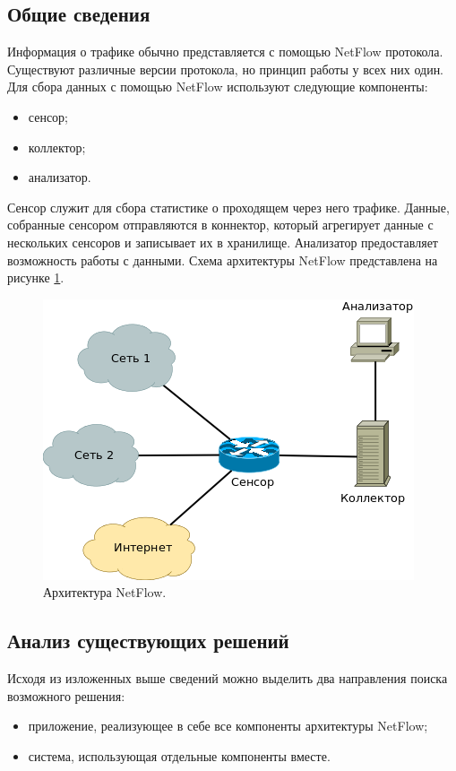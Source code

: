 \subsection{ Общие сведения }
Информация о трафике обычно представляется с помощью NetFlow протокола\cite{netflow}. Существуют различные версии протокола, но принцип работы у всех них один. Для сбора данных с помощью NetFlow используют следующие компоненты:
\begin{itemize}
	\item сенсор;
	\item коллектор;
	\item анализатор.
\end{itemize}
Сенсор служит для сбора статистике о проходящем через него трафике. Данные, собранные сенсором отправляются в коннектор, который агрегирует данные с нескольких сенсоров и записывает их в хранилище. Анализатор предоставляет возможность работы с данными. Схема архитектуры NetFlow представлена на рисунке \ref{netflow}.
\begin{figure}[H]
	\centering
	\includegraphics[scale=0.5]{netflow.png}
	\caption{Архитектура NetFlow.}
	\label{netflow}
\end{figure}

\subsection{ Анализ существующих решений}
Исходя из изложенных выше сведений можно выделить два направления поиска возможного решения:
\begin{itemize}
	\item приложение, реализующее в себе все компоненты архитектуры NetFlow;
	\item система, использующая отдельные компоненты вместе.
\end{itemize}

